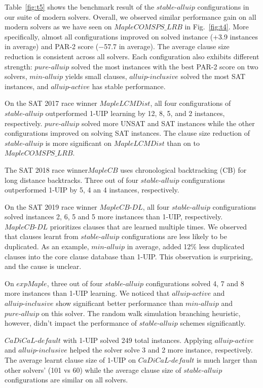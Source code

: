 \documentclass[runningheads]{llncs}
\newcommand{\oneuip}{1-UIP\xspace}
\newcommand{\stablealluip}{\textit{stable-alluip}\xspace}
\newcommand{\allUipPure}{\textit{pure-alluip}\xspace}
\newcommand{\allUipMin}{\textit{min-alluip}\xspace}
\newcommand{\allUipAct}{\textit{alluip-active}}
\newcommand{\allUipIn}{\textit{alluip-inclusive}}
\newcommand{\MapleBase}{\textit{MapleCOMSPS\_LRB}}
\newcommand{\MapleSeven}{\textit{MapleLCMDist}}
\newcommand{\MapleNineShort}{\textit{MapleCB-DL} }
\newcommand{\expSATShort}{\textit{expMaple} }
\newcommand{\defaultcadical}{\textit{CaDiCaL-default}}
\newcommand{\MapleEightShort}{\textit{MapleCB}}
\begin{document}
Table~\ref{fig:t5} shows the benchmark result of the $\stablealluip$
configurations in our suite of modern solvers. Overall, we observed
similar performance gain on all modern solvers as we have seen on
$\MapleBase$ in Fig.~\ref{fig:t4}. More specifically, almost all
configurations improved on solved instance (+3.9 instances in average)
and PAR-2 score ($-$57.7 in average).  The average clause size
reduction is consistent across all solvers. Each configuration also
exhibits different strength: $\allUipPure$ solved the most instances
with the best PAR-2 score on two solvers, $\allUipMin$ yields small
clauses, $\allUipIn$ solved the most SAT instances, and $\allUipAct$
has stable performance.


On the SAT 2017 race winner $\MapleSeven$, all four configurations of
$\stablealluip$ outperformed \oneuip learning by 12, 8, 5, and 2 instances,
respectively. $\allUipPure$ solved more UNSAT and SAT instances while
the other configurations improved on solving SAT instances. The clause
size reduction of $\stablealluip$ is more significant on $\MapleSeven$
than on to $\MapleBase$.

The SAT 2018 race winner$\MapleEightShort$ uses chronological
backtracking (CB) for long distance backtracks. Three out of four
$\stablealluip$ configurations outperformed \oneuip by 5, 4 an 4 instances,
respectively.

On the SAT 2019 race winner $\MapleNineShort$, all four
$\stablealluip$ configurations solved instances 2, 6, 5 and 5 more instances
than \oneuip, respectively. $\MapleNineShort$ prioritizes clauses that
are learned multiple times. We observed that clauses learnt from
$\stablealluip$ configurations are less likely to be duplicated. As an
example, $\allUipMin$ in average, added 12\% less duplicated clauses
into the core clause database than \oneuip. This observation is
surprising, and the cause is unclear.


On $\expSATShort$, three out of four $\stablealluip$ configurations solved
4, 7 and 8 more instances than \oneuip learning. We noticed that
$\allUipAct$ and $\allUipIn$ show significant better performance than
$\allUipMin$ and $\allUipPure$ on this solver. The random walk
simulation branching heuristic, however, didn't impact the performance
of $\stablealluip$ schemes significantly.

$\defaultcadical$ with \oneuip solved 249 total instances. 
Applying $\allUipAct$ and $\allUipIn$ helped the solver solve 3 and 2 more instance, respectively.  
The average learnt clause size of \oneuip on 
$\defaultcadical$ is much larger than other solvers' (101 vs 60) 
while the average clause size of $\stablealluip$ configurations are similar on all solvers.
\end{document}
